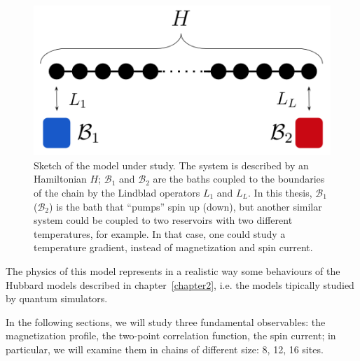 \begin{figure}[H]
    \centering
    \includegraphics[scale=0.6]{Figures/sketch_model.png}
    \captionsetup{width=1.\linewidth}
    \caption{Sketch of the model under study. The system is described by an Hamiltonian $H$; $\mathcal{B}_1$ and $\mathcal{B}_2$ are the baths coupled to the boundaries of the chain by the Lindblad operators $L_1$ and $L_L$. In this thesis, $\mathcal{B}_1$ ($\mathcal{B}_2$) is the bath that ``pumps'' spin up (down), but another similar system could be coupled to two reservoirs with two different temperatures, for example. In that case, one could study a temperature gradient, instead of magnetization and spin current.}
    \label{fig:sketch_model}
\end{figure}


The physics of this model represents in a realistic way some behaviours of the Hubbard models described in chapter~\ref{chapter2}, i.e. the models tipically studied by quantum simulators.

In the following sections, we will study three fundamental observables: the magnetization profile, the two-point correlation function, the spin current; in particular, we will examine them in chains of different size: 8, 12, 16 sites. 

